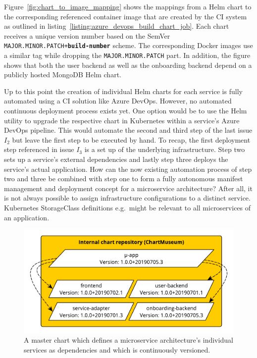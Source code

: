 Figure~\ref{fig:chart_to_image_mapping} shows the mappings from a Helm chart to
the corresponding referenced container image that are created by the \ac{CI}
system as outlined in listing~\ref{listing:azure_devops_build_chart_job}. Each
chart receives a unique version number based on the SemVer
\texttt{MAJOR.MINOR.PATCH+\textbf{build-number}} scheme. The corresponding
Docker images use a similar tag while dropping the \texttt{MAJOR.MINOR.PATCH}
part. In addition, the figure shows that both the user backend as well as the
onboarding backend depend on a publicly hosted MongoDB Helm chart.

Up to this point the creation of individual Helm charts for each service is
fully automated using a \ac{CI} solution like Azure DevOps. However, no
automated continuous deployment process exists yet. One option would be to use
the Helm utility to upgrade the respective chart in Kubernetes within a
service's Azure DevOps pipeline. This would automate the second and third step
of the last issue $I_2$ but leave the first step to be executed by hand. To
recap, the first deployment step referenced in issue $I_3$ is a set up of the
underlying infrastructure. Step two sets up a service's external dependencies
and lastly step three deploys the service's actual application.  How can the
now existing automation process of step two and three be combined with step one
to form a fully autonomous manifest management and deployment concept for a
microservice architecture? After all, it is not always possible to assign
infrastructure configurations to a distinct service. Kubernetes StorageClass
definitions e.g.\ might be relevant to all microservices of an application.

\begin{figure}[H]
\begin{center}
  \includegraphics[scale=0.7]{images/figures/master_chart.pdf}
\end{center}
\caption{A master chart which defines a microservice architecture's individual
services as dependencies and which is continuously versioned.}%
\label{fig:master_chart}
\end{figure}

